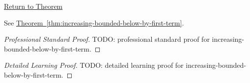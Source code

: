 \newpage
{}
\label{prf:increasing-bounded-below-by-first-term}

\begin{remark*}[Return]
\hyperref[thm:increasing-bounded-below-by-first-term]{Return to Theorem}
\end{remark*}

\begin{theorem*}
See \hyperref[thm:increasing-bounded-below-by-first-term]{Theorem~\ref*{thm:increasing-bounded-below-by-first-term}}.
\end{theorem*}

\begin{proof}[Professional Standard Proof]
\LRAProofBodyStart
TODO: professional standard proof for increasing-bounded-below-by-first-term.
\end{proof}

\begin{proof}[Detailed Learning Proof]
\LRAProofBodyStart
TODO: detailed learning proof for increasing-bounded-below-by-first-term.
\end{proof}

\begin{remark*}
\end{remark*}

\begin{dependencies}
\NoLocalDependencies
\end{dependencies}

\clearpage
